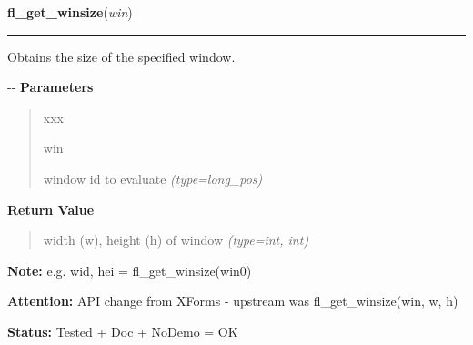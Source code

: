 \hspace{.8\funcindent}\begin{boxedminipage}{\funcwidth}

    \raggedright \textbf{fl\_get\_winsize}(\textit{win})

    \vspace{-1.5ex}

    \rule{\textwidth}{0.5\fboxrule}
\setlength{\parskip}{2ex}

Obtains the size of the specified window.

-{}-
\setlength{\parskip}{1ex}
      \textbf{Parameters}
      \vspace{-1ex}

      \begin{quote}
        \begin{Ventry}{xxx}

          \item[win]


window id to evaluate
            {\it (type=long\_pos)}

        \end{Ventry}

      \end{quote}

      \textbf{Return Value}
    \vspace{-1ex}

      \begin{quote}

width (w), height (h) of window
      {\it (type=int, int)}

      \end{quote}

\textbf{Note:} 
e.g. wid, hei = fl\_get\_winsize(win0)


\textbf{Attention:} 
API change from XForms - upstream was
fl\_get\_winsize(win, w, h)


\textbf{Status:} 
Tested + Doc + NoDemo = OK


    \end{boxedminipage}

    \label{xformslib:flxbasic:fl_get_winorigin}

    \vspace{0.5ex}

